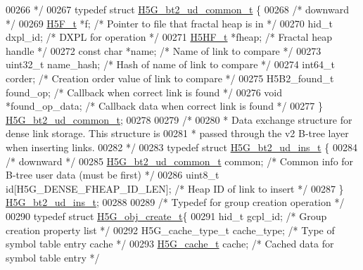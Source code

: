 \begin{DoxyCode}
00266 \textcolor{comment}{ */}
00267 \textcolor{keyword}{typedef} \textcolor{keyword}{struct }\hyperlink{struct_h5_g__bt2__ud__common__t}{H5G\_bt2\_ud\_common\_t} \{
00268     \textcolor{comment}{/* downward */}
00269     \hyperlink{struct_h5_f__t}{H5F\_t}       *f;                     \textcolor{comment}{/* Pointer to file that fractal heap is in */}
00270     hid\_t       dxpl\_id;                \textcolor{comment}{/* DXPL for operation                */}
00271     \hyperlink{struct_h5_h_f__t}{H5HF\_t}      *fheap;                 \textcolor{comment}{/* Fractal heap handle               */}
00272     \textcolor{keyword}{const} \textcolor{keywordtype}{char}  *name;                  \textcolor{comment}{/* Name of link to compare           */}
00273     uint32\_t    name\_hash;              \textcolor{comment}{/* Hash of name of link to compare   */}
00274     int64\_t     corder;                 \textcolor{comment}{/* Creation order value of link to compare   */}
00275     H5B2\_found\_t found\_op;              \textcolor{comment}{/* Callback when correct link is found */}
00276     \textcolor{keywordtype}{void}        *found\_op\_data;         \textcolor{comment}{/* Callback data when correct link is found */}
00277 \} \hyperlink{struct_h5_g__bt2__ud__common__t}{H5G\_bt2\_ud\_common\_t};
00278 
00279 \textcolor{comment}{/*}
00280 \textcolor{comment}{ * Data exchange structure for dense link storage.  This structure is}
00281 \textcolor{comment}{ * passed through the v2 B-tree layer when inserting links.}
00282 \textcolor{comment}{ */}
00283 \textcolor{keyword}{typedef} \textcolor{keyword}{struct }\hyperlink{struct_h5_g__bt2__ud__ins__t}{H5G\_bt2\_ud\_ins\_t} \{
00284     \textcolor{comment}{/* downward */}
00285     \hyperlink{struct_h5_g__bt2__ud__common__t}{H5G\_bt2\_ud\_common\_t} common;         \textcolor{comment}{/* Common info for B-tree user data (must be
       first) */}
00286     uint8\_t \textcolor{keywordtype}{id}[H5G\_DENSE\_FHEAP\_ID\_LEN]; \textcolor{comment}{/* Heap ID of link to insert         */}
00287 \} \hyperlink{struct_h5_g__bt2__ud__ins__t}{H5G\_bt2\_ud\_ins\_t};
00288 
00289 \textcolor{comment}{/* Typedef for group creation operation */}
00290 \textcolor{keyword}{typedef} \textcolor{keyword}{struct }\hyperlink{struct_h5_g__obj__create__t}{H5G\_obj\_create\_t}\{
00291     hid\_t gcpl\_id;              \textcolor{comment}{/* Group creation property list */}
00292     H5G\_cache\_type\_t cache\_type; \textcolor{comment}{/* Type of symbol table entry cache */}
00293     \hyperlink{union_h5_g__cache__t}{H5G\_cache\_t} cache;          \textcolor{comment}{/* Cached data for symbol table entry */}

\end{DoxyCode}

